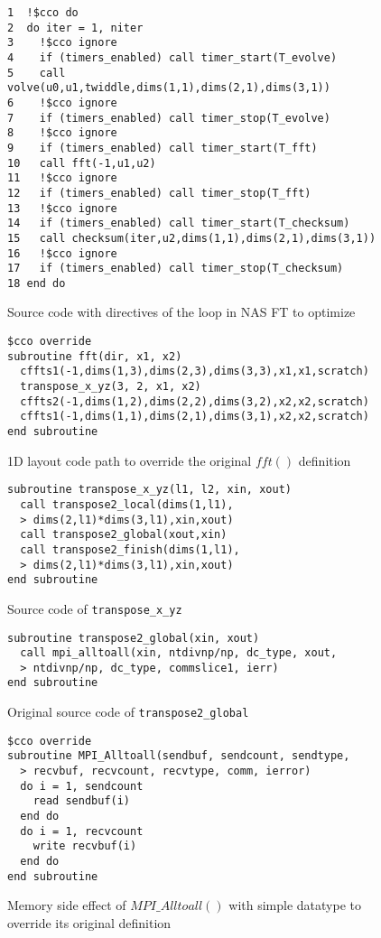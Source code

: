 \begin{figure}[h]
{\scriptsize
\begin{verbatim}
1  !$cco do
2  do iter = 1, niter
3    !$cco ignore
4    if (timers_enabled) call timer_start(T_evolve)
5    call volve(u0,u1,twiddle,dims(1,1),dims(2,1),dims(3,1))
6    !$cco ignore
7    if (timers_enabled) call timer_stop(T_evolve)
8    !$cco ignore
9    if (timers_enabled) call timer_start(T_fft)
10   call fft(-1,u1,u2)
11   !$cco ignore
12   if (timers_enabled) call timer_stop(T_fft)
13   !$cco ignore
14   if (timers_enabled) call timer_start(T_checksum)
15   call checksum(iter,u2,dims(1,1),dims(2,1),dims(3,1))
16   !$cco ignore
17   if (timers_enabled) call timer_stop(T_checksum)
18 end do
\end{verbatim}
}
\caption{Source code with directives of the loop in NAS FT to optimize}
\label{fig:code:ft}
\end{figure}

\begin{figure}[h]
{\scriptsize
\begin{verbatim}
$cco override
subroutine fft(dir, x1, x2)
  cffts1(-1,dims(1,3),dims(2,3),dims(3,3),x1,x1,scratch)
  transpose_x_yz(3, 2, x1, x2)
  cffts2(-1,dims(1,2),dims(2,2),dims(3,2),x2,x2,scratch)
  cffts1(-1,dims(1,1),dims(2,1),dims(3,1),x2,x2,scratch)
end subroutine
\end{verbatim}
}
\caption{1D layout code path to override the original $fft()$ definition}
\label{fig:annot:ft}
\end{figure}

\begin{figure}[h]
{\scriptsize
\begin{verbatim}
subroutine transpose_x_yz(l1, l2, xin, xout)
  call transpose2_local(dims(1,l1),
  > dims(2,l1)*dims(3,l1),xin,xout)
  call transpose2_global(xout,xin)
  call transpose2_finish(dims(1,l1),
  > dims(2,l1)*dims(3,l1),xin,xout)
end subroutine
\end{verbatim}
}
\caption{Source code of \texttt{transpose\_x\_yz}}
\label{fig:code:transpose}
\end{figure}

\begin{figure}[h]
{\scriptsize
\begin{verbatim}
subroutine transpose2_global(xin, xout)
  call mpi_alltoall(xin, ntdivnp/np, dc_type, xout,
  > ntdivnp/np, dc_type, commslice1, ierr)
end subroutine
\end{verbatim}
}
\caption{Original source code of \texttt{transpose2\_global}}
\label{fig:code:transpose2}
\end{figure}

\begin{figure}[h]
{\scriptsize
\begin{verbatim}
$cco override
subroutine MPI_Alltoall(sendbuf, sendcount, sendtype,
  > recvbuf, recvcount, recvtype, comm, ierror)
  do i = 1, sendcount
    read sendbuf(i)
  end do
  do i = 1, recvcount
    write recvbuf(i)
  end do
end subroutine
\end{verbatim}
}
\caption{Memory side effect of $MPI\_Alltoall()$ with simple datatype to override its original definition}
\label{fig:annot:a2a}
\end{figure}
